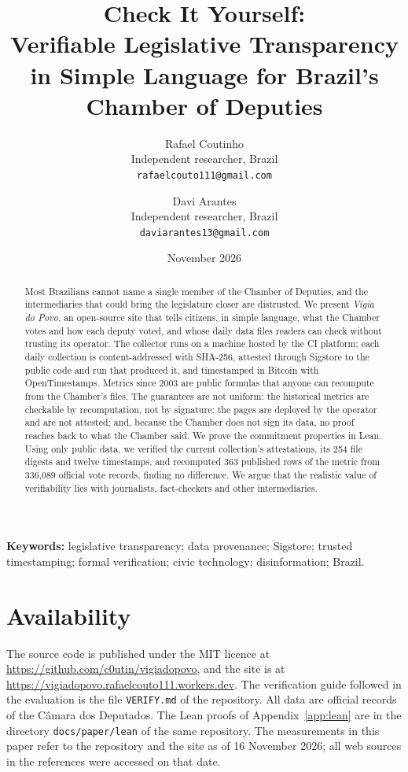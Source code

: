 \documentclass[11pt,a4paper]{article}
\title{\textbf{Check It Yourself:\\ Verifiable Legislative Transparency\\ in Simple Language for Brazil's Chamber of Deputies}}
\author{Rafael Coutinho\\[2pt]
{\small Independent researcher, Brazil}\\
{\small\texttt{rafaelcouto111@gmail.com}}
\and
Davi Arantes\\[2pt]
{\small Independent researcher, Brazil}\\
{\small\texttt{daviarantes13@gmail.com}}}
\date{November 2026}
\begin{document}
\maketitle

\begin{abstract}
\noindent
Most Brazilians cannot name a single member of the Chamber of Deputies, and the intermediaries that could bring the legislature closer are distrusted. We present \emph{Vigia do Povo}, an open-source site that tells citizens, in simple language, what the Chamber votes and how each deputy voted, and whose daily data files readers can check without trusting its operator. The collector runs on a machine hosted by the CI platform; each daily collection is content-addressed with SHA-256, attested through Sigstore to the public code and run that produced it, and timestamped in Bitcoin with OpenTimestamps. Metrics since 2003 are public formulas that anyone can recompute from the Chamber's files. The guarantees are not uniform: the historical metrics are checkable by recomputation, not by signature; the pages are deployed by the operator and are not attested; and, because the Chamber does not sign its data, no proof reaches back to what the Chamber said. We prove the commitment properties in Lean. Using only public data, we verified the current collection's attestations, its 254 file digests and twelve timestamps, and recomputed 363 published rows of the metric from 336,089 official vote records, finding no difference. We argue that the realistic value of verifiability lies with journalists, fact-checkers and other intermediaries.
\end{abstract}

\noindent\textbf{Keywords:} legislative transparency; data provenance; Sigstore; trusted timestamping; formal verification; civic technology; disinformation; Brazil.











\section*{Availability}

The source code is published under the MIT licence at \url{https://github.com/c0utin/vigiadopovo}, and the site is at \url{https://vigiadopovo.rafaelcouto111.workers.dev}. The verification guide followed in the evaluation is the file \texttt{VERIFY.md} of the repository. All data are official records of the C\^amara dos Deputados. The Lean proofs of Appendix~\ref{app:lean} are in the directory \texttt{docs/paper/lean} of the same repository. The measurements in this paper refer to the repository and the site as of 16 November 2026; all web sources in the references were accessed on that date.
\end{document}
